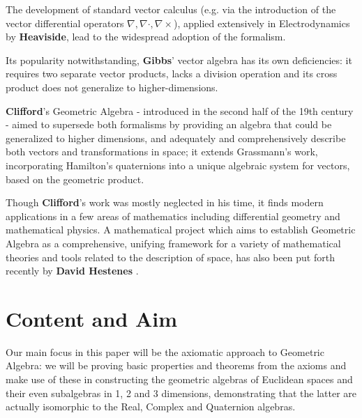The development of standard vector calculus (e.g. via the introduction of the vector differential operators $\nabla, \nabla \cdot, \nabla \times$), applied extensively in Electrodynamics by \textbf{Heaviside}, lead to the widespread adoption of the formalism.

Its popularity notwithstanding, \textbf{Gibbs}' vector algebra has its own deficiencies: it requires two separate vector products, lacks a division operation and its cross product does not generalize to higher-dimensions.

\textbf{Clifford}'s  Geometric Algebra - introduced in the second half of the 19th century - aimed to supersede both formalisms by providing an algebra that could be generalized to higher dimensions, and adequately and comprehensively describe both vectors and transformations in space; it extends Grassmann's work, incorporating Hamilton's quaternions into a unique algebraic system for vectors, based on the geometric product.

Though \textbf{Clifford}'s work was mostly neglected in his time, it finds modern applications in a few areas of mathematics including differential geometry and mathematical physics. A mathematical project which aims to establish Geometric Algebra as a comprehensive, unifying framework for a variety of mathematical theories and tools related to the description of space, has also been put forth recently by \textbf{David Hestenes} \cite{ga-origin}.%


\section{Content and Aim}

Our main focus in this paper will be the axiomatic approach to Geometric Algebra: we will be proving basic properties and theorems from the axioms and make use of these in constructing the geometric algebras of Euclidean spaces and their even subalgebras in 1, 2 and 3 dimensions, demonstrating that the latter are actually isomorphic to the Real, Complex and Quaternion algebras.

